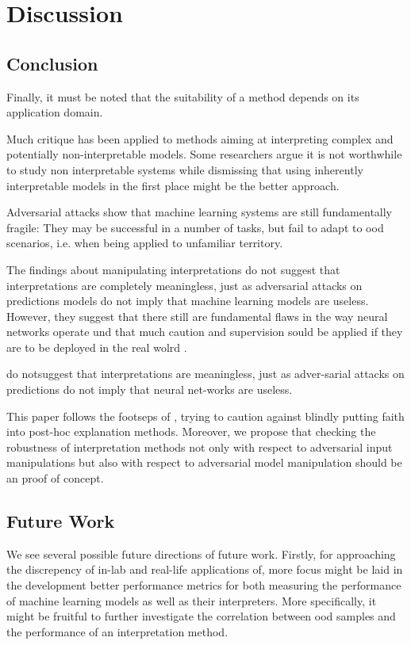 \section{Discussion}

\subsection{Conclusion}
Finally, it must be noted that the suitability of a method depends on its application domain. 


Much critique has been applied to methods aiming at interpreting complex and potentially non-interpretable models. 
Some researchers argue it is not worthwhile to study non interpretable systems while dismissing that using inherently interpretable models in the first place might be the better approach. 

Adversarial attacks show that machine learning systems are still fundamentally fragile: They may be successful in a number of tasks, but fail to adapt to ood scenarios, i.e. when being applied to unfamiliar territory. 

 The findings about manipulating interpretations do not suggest that interpretations are completely meaningless, just as adversarial attacks on predictions models do not imply that machine learning models are useless. However, they suggest that there still are fundamental flaws in the way neural networks operate und that much caution and supervision sould be applied if they are to be deployed in the real wolrd .


do  notsuggest that interpretations are meaningless, just as adver-sarial  attacks  on  predictions  do  not  imply  that  neural  net-works are useless. 

This paper follows the footseps of \cite{lipton2018mythos}, trying to caution against blindly putting faith into post-hoc explanation methods. 
Moreover, we propose that checking the robustness of interpretation methods not only with respect to adversarial input manipulations but also with respect to adversarial model manipulation should be an proof of concept. 




\subsection{Future Work}
We see several possible future directions of future work. 
Firstly, for approaching the discrepency of in-lab and real-life applications of, more focus might be laid in the development better performance metrics for both measuring the performance of machine learning models as well as their interpreters. 
More specifically, it might be fruitful to further investigate the correlation between ood samples and the performance of an interpretation method.